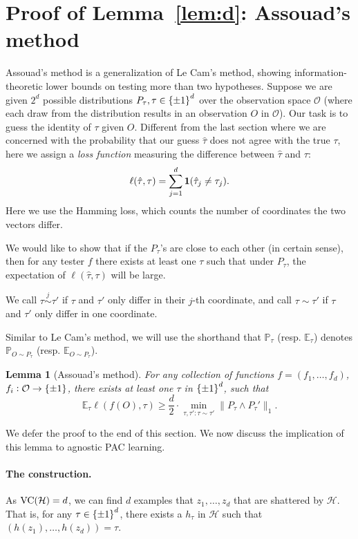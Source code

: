 \documentclass{article}
\newtheorem{lemma}{Lemma}
\DeclareMathOperator*{\VC}{{\rm VC}}
\newcommand{\EE}{\mathbb{E}}
\newcommand{\PP}{\mathbb{P}}
\newcommand{\Hcal}{\mathcal{H}}
\newcommand{\Ocal}{\mathcal{O}}
\newcommand*{\one}{{\bf 1}}
\begin{document}
\section{Proof of Lemma~\ref{lem:d}: Assouad's method}
Assouad's method is a generalization of Le Cam's method, showing
information-theoretic lower bounds on testing more than two hypotheses.
Suppose we are given $2^d$ possible distributions $P_\tau, \tau \in \cbr{\pm 1}^d$
over the observation space $\Ocal$ (where each draw from the distribution results in an observation $O$ in $\Ocal$).
Our task is to guess the identity of $\tau$ given $O$. Different from
the last section where we are concerned with the probability that our
guess $\hat{\tau}$ does not agree with the true $\tau$, here we assign a
{\em loss function} measuring the difference between $\hat{\tau}$ and $\tau$:
\[ \ell(\hat{\tau}, \tau) = \sum_{j=1}^d \one(\hat{\tau}_j \neq \tau_j). \]
Here we use the Hamming loss, which counts the number of coordinates the two
vectors differ.

We would like to show that if the $P_\tau$'s are close to each other (in certain sense),
then for any tester $f$ there exists at least one $\tau$ such that under $P_\tau$,
the expectation of $\ell(\hat{\tau}, \tau)$ will be large.

We call $\tau\stackrel{j}{\sim}\tau'$ if $\tau$ and $\tau'$ only differ
in their $j$-th coordinate, and call $\tau \sim \tau'$ if $\tau$ and $\tau'$
only differ in one coordinate.

Similar to Le Cam's method, we will use the shorthand that $\PP_\tau$ (resp. $\EE_\tau$) denotes $\PP_{O \sim P_\tau}$ (resp. $\EE_{O \sim P_\tau}$).

\begin{lemma}[Assouad's method]
For any collection of functions $f = (f_1, \ldots, f_d)$, $f_i: \Ocal \to \cbr{\pm 1}$, there exists at least one
$\tau$ in $\cbr{\pm 1}^d$, such that
\[ \EE_{\tau} \ell(f(O), \tau) \geq \frac{d}{2} \cdot \min_{\tau, \tau': \tau \sim \tau'} \| P_\tau \wedge P_\tau' \|_1.  \]
\label{lem:assouad}
\end{lemma}

We defer the proof to the end of this section. We now discuss the implication of this lemma to agnostic PAC learning.

\paragraph{The construction.} As $\VC(\Hcal) = d$, we can find $d$ examples
 that $z_1,\ldots,z_d$ that are shattered by $\Hcal$. That is, for any $\tau \in \cbr{\pm 1}^d$, there exists a $h_\tau$ in $\Hcal$ such that $(h(z_1), \ldots, h(z_d)) = \tau$.
\end{document}
